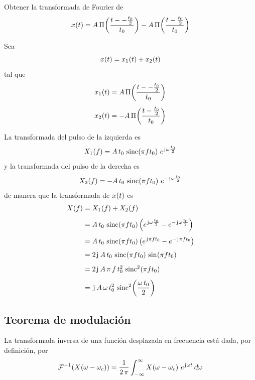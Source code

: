 \begin{mdframed}[style=ExampleFrame]
    \begin{example}
    \end{example}
    Obtener la transformada de Fourier de
    \[
        \fx[x]{t} = A \, \pulse[- \frac{t_0}{2}]{t}{t_0} - A \, \pulse[\frac{t_0}{2}]{t}{t_0} %
    \]


    Sea
    \[
        \fx[x]{t} = \fx[x_1]{t} + \fx[x_2]{t}
    \]
    tal que
    \begin{gather*}
        \fx[x_1]{t} = A \, \pulse[- \frac{t_0}{2}]{t}{t_0} %
        \\[1ex]
        \fx[x_2]{t} = - A \, \pulse[\frac{t_0}{2}]{t}{t_0}
    \end{gather*}

    La transformada del pulso de la izquierda es
    \[
        \fx[X_1]{f} = A \, t_0 \, \fx[\sinc]{\pi f t_0} \, e^{\iu \omega \frac{t_0}{2}}
    \]
    y la transformada del pulso de la derecha es
    \[
        \fx[X_2]{f} = - A \, t_0 \, \fx[\sinc]{\pi f t_0} \, e^{- \iu \omega \frac{t_0}{2}}
    \]
    de manera que la transformada de $\fx[x]{t}$ es
    \begin{align*}
        \fx[X]{f}
        & = \fx[X_1]{f} + \fx[X_2]{f}
        \\[1ex]
        & = A \, t_0 \, \fx[\sinc]{\pi f t_0} \inParentheses{e^{\iu \omega \frac{t_0}{2}} - e^{- \iu \omega \frac{t_0}{2}}}
        \\[1ex]
        & = A \, t_0 \, \fx[\sinc]{\pi f t_0} \inParentheses{e^{\iu \pi f t_0} - e^{- \iu \pi f t_0}}
        \\[1ex]
        & = 2 \iu \, A \, t_0 \, \fx[\sinc]{\pi f t_0} \, \fx[\sin]{\pi f t_0}
        \\[1ex]
        & = 2 \iu \, A \, \pi \, f \, t_0^2 \, \fx[\sinc^2]{\pi f t_0}
        \\[1ex]
        & = \iu \, A \, \omega \, t_0^2 \, \fx[\sinc^2]{\frac{\omega \, t_0}{2}}
    \end{align*}
\end{mdframed}

\subsection{Teorema de modulación}

La transformada inversa de una función desplazada en frecuencia está dada, por definición, por
\[
    \ffourier{\fx[X]{\omega - \omega_c}}
    = \frac{1}{2 \, \pi} \int_{-\infty}^\infty \fx[X]{\omega - \omega_c} \, \complexExp \, \dif \omega
\]

